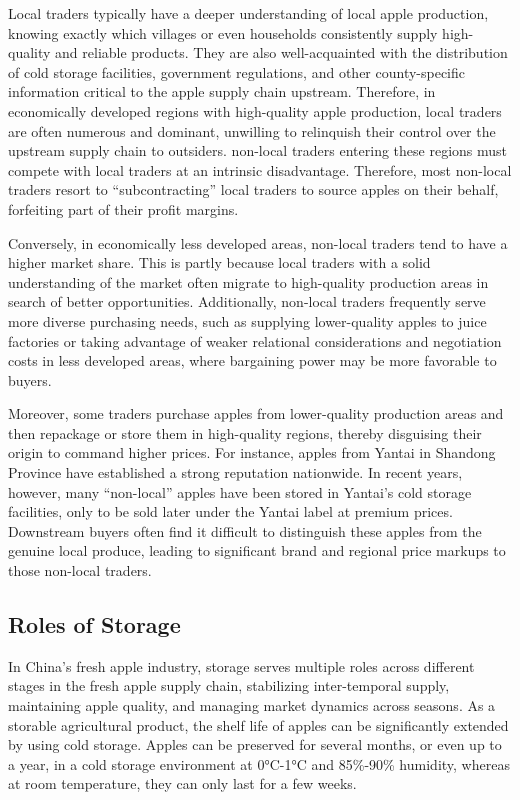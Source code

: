 Local traders typically have a deeper understanding of local apple production, knowing exactly which villages or even households consistently supply high-quality and reliable products. They are also well-acquainted with the distribution of cold storage facilities, government regulations, and other county-specific information critical to the apple supply chain upstream. Therefore, in economically developed regions with high-quality apple production, local traders are often numerous and dominant, unwilling to relinquish their control over the upstream supply chain to outsiders. non-local traders entering these regions must compete with local traders at an intrinsic disadvantage. Therefore, most non-local traders resort to ``subcontracting'' local traders to source apples on their behalf, forfeiting part of their profit margins.  

Conversely, in economically less developed areas, non-local traders tend to have a higher market share. This is partly because local traders with a solid understanding of the market often migrate to high-quality production areas in search of better opportunities. Additionally, non-local traders frequently serve more diverse purchasing needs, such as supplying lower-quality apples to juice factories or taking advantage of weaker relational considerations and negotiation costs in less developed areas, where bargaining power may be more favorable to buyers.  

Moreover, some traders purchase apples from lower-quality production areas and then repackage or store them in high-quality regions, thereby disguising their origin to command higher prices. For instance, apples from Yantai in Shandong Province have established a strong reputation nationwide. In recent years, however, many ``non-local'' apples have been stored in Yantai's cold storage facilities, only to be sold later under the Yantai label at premium prices. Downstream buyers often find it difficult to distinguish these apples from the genuine local produce, leading to significant brand and regional price markups to those non-local traders.


\subsection{Roles of Storage \label{Section: role of Storage}}
\noindent In China's fresh apple industry, storage serves multiple roles across different stages in the fresh apple supply chain, stabilizing inter-temporal supply, maintaining apple quality, and managing market dynamics across seasons. As a storable agricultural product, the shelf life of apples can be significantly extended by using cold storage. Apples can be preserved for several months, or even up to a year, in a cold storage environment at 0°C-1°C and 85\%-90\% humidity, whereas at room temperature, they can only last for a few weeks.

